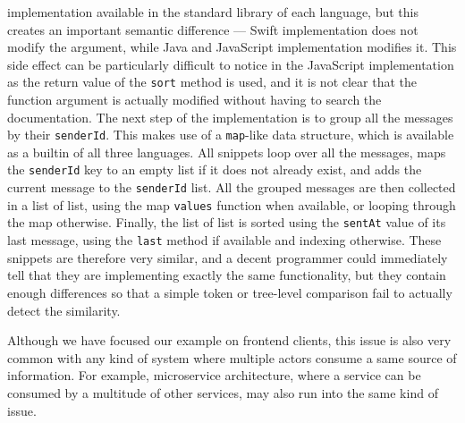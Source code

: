 implementation available in the standard library of each language, but this
creates an important semantic difference --- Swift implementation does not
modify the argument, while Java and JavaScript implementation modifies it. This
side effect can be particularly difficult to notice in the JavaScript
implementation as the return value of the \lstinline{sort} method is used, and
it is not clear that the function argument is actually modified without having
to search the documentation. The next step of the implementation is to group all
the messages by their \lstinline{senderId}. This makes use of a
\lstinline{map}-like data structure, which is available as a builtin of all
three languages. All snippets loop over all the messages, maps the
\lstinline{senderId} key to an empty list if it does not already exist, and adds
the current message to the \lstinline{senderId} list. All the grouped messages
are then collected in a list of list, using the map \lstinline{values} function
when available, or looping through the map otherwise. Finally, the list of list
is sorted using the \lstinline{sentAt} value of its last message, using the
\lstinline{last} method if available and indexing otherwise. These snippets are
therefore very similar, and a decent programmer could immediately tell that they
are implementing exactly the same functionality, but they contain enough
differences so that a simple token or tree-level comparison fail to actually
detect the similarity.

Although we have focused our example on frontend clients, this issue is also
very common with any kind of system where multiple actors consume a same source
of information. For example, microservice architecture, where a service can be
consumed by a multitude of other services, may also run into the same kind of
issue.
